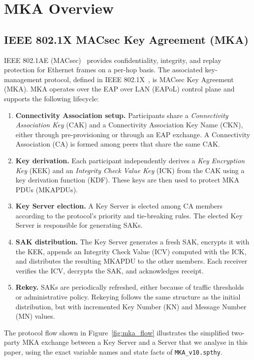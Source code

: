 \section{MKA Overview}
\label{sec:background}

\subsection{IEEE 802.1X MACsec Key Agreement (MKA)}

IEEE 802.1AE (MACsec)~\cite{ieee8021ae} provides confidentiality, integrity, and replay protection for Ethernet frames on a per-hop basis. The associated key-management protocol, defined in IEEE 802.1X~\cite{ieee8021x}, is MACsec Key Agreement (MKA). MKA operates over the EAP over LAN (EAPoL) control plane and supports the following lifecycle:

\begin{enumerate}
  \item \textbf{Connectivity Association setup.} Participants share a \emph{Connectivity Association Key} (CAK) and a Connectivity Association Key Name (CKN), either through pre-provisioning or through an EAP exchange. A Connectivity Association (CA) is formed among peers that share the same CAK.
  \item \textbf{Key derivation.} Each participant independently derives a \emph{Key Encryption Key} (KEK) and an \emph{Integrity Check Value Key} (ICK) from the CAK using a key derivation function (KDF). These keys are then used to protect MKA PDUs (MKAPDUs).
  \item \textbf{Key Server election.} A Key Server is elected among CA members according to the protocol’s priority and tie-breaking rules. The elected Key Server is responsible for generating SAKs.
  \item \textbf{SAK distribution.} The Key Server generates a fresh SAK, encrypts it with the KEK, appends an Integrity Check Value (ICV) computed with the ICK, and distributes the resulting MKAPDU to the other members. Each receiver verifies the ICV, decrypts the SAK, and acknowledges receipt.
  \item \textbf{Rekey.} SAKs are periodically refreshed, either because of traffic thresholds or administrative policy. Rekeying follows the same structure as the initial distribution, but with incremented Key Number (KN) and Message Number (MN) values.
\end{enumerate}

The protocol flow shown in Figure~\ref{fig:mka_flow} illustrates the simplified two-party MKA exchange between a Key Server and a Server that we analyse in this paper, using the exact variable names and state facts of \texttt{MKA\_v10.spthy}.

